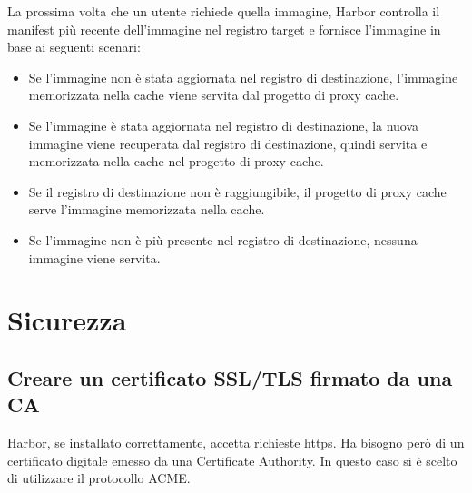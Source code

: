 \documentclass[12pt]{report}
\begin{document}
La prossima volta che un utente richiede quella immagine, Harbor controlla il manifest più recente dell'immagine nel registro target e fornisce l'immagine in base ai seguenti scenari:
\begin{itemize}
    \item Se l'immagine non è stata aggiornata nel registro di destinazione, l'immagine memorizzata nella cache viene servita dal progetto di proxy cache.
    \item Se l'immagine è stata aggiornata nel registro di destinazione, la nuova immagine viene recuperata dal registro di destinazione, quindi servita e memorizzata nella cache nel progetto di proxy cache.
    \item Se il registro di destinazione non è raggiungibile, il progetto di proxy cache serve l'immagine memorizzata nella cache.
    \item Se l'immagine non è più presente nel registro di destinazione, nessuna immagine viene servita. \cite{harbor-pull-through-cache}
\end{itemize}

\chapter{Sicurezza}
\section{Creare un certificato SSL/TLS firmato da una CA}
Harbor, se installato correttamente, accetta richieste https. Ha bisogno però di un certificato digitale emesso da una Certificate Authority. In questo caso si è scelto di utilizzare il protocollo ACME. 
\end{document}
